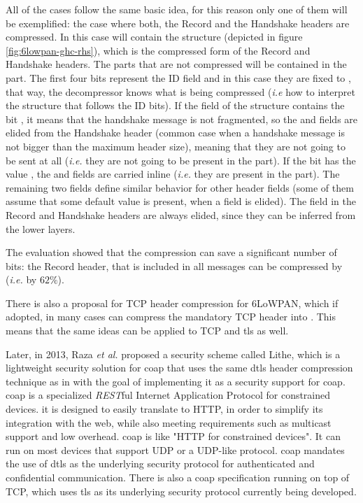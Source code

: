 \documentclass{llncs}
\begin{document}
All of the cases follow the same basic idea, for this reason only one of them will be exemplified:
the case where both, the Record and the Handshake headers are compressed.
In this case  will contain the 
structure (depicted in figure \ref{fig:6lowpan-ghc-rhs}), which is the compressed form of the Record and Handshake headers. The
parts that are not compressed will be contained in the  part.
The first four bits represent the ID field and in this case they are fixed to ,
that way, the decompressor knows what is being compressed (\textit{i.e} how to interpret
the structure that follows the ID bits). If the  field of the  structure contains the
bit , it means that the handshake message is not fragmented, so
the  and  fields are
elided from the Handshake header (common case when a handshake message is not bigger than
the maximum header size), meaning that they are not going to be sent at
all (\textit{i.e.} they are not going to be present in the  part).
If the  bit has the value , the 
and  fields are carried inline (\textit{i.e.} they are
present in the  part). The remaining two fields define similar
behavior for other header fields (some of them assume that some default value is present, when a field is elided).
The  field in the Record and Handshake headers are always elided,
since they can be inferred from the lower layers.

The evaluation showed that the compression can save a significant number of bits:
the Record header, that is included in all messages can be compressed by 
(\textit{i.e.} by $62\%$).

There is also a proposal for TCP header compression for 6LoWPAN\cite{I-D.aayadi-6lowpan-tcphc},
which if adopted, in many cases can compress the mandatory  TCP header
into . This means that the same ideas can be applied to TCP and
\gls{tls} as well.

Later, in 2013, Raza \textit{et al.} proposed a security scheme called Lithe\cite{LitheLig40:online},
which is a lightweight security solution for \gls{coap} that uses the same \gls{dtls} header
compression technique as in \cite{6LoWPANC53:online} with the goal of implementing
it as a security support for \gls{coap}. \gls{coap}\cite{RFC7959} is a specialized
\textit{REST}ful Internet Application Protocol for constrained devices. it is designed to easily
translate to HTTP, in order to simplify its integration with the web,
while also meeting requirements such as multicast support and low overhead.
\gls{coap} is like "HTTP for constrained devices".
It can run on most devices that support UDP or a UDP-like protocol.
\gls{coap} mandates the use of \gls{dtls} as the underlying security protocol for
authenticated and confidential communication. There is also a \gls{coap} specification
running on top of TCP, which uses \gls{tls} as its underlying security protocol
currently being developed\cite{I-D.ietf-core-coap-tcp-tls}.
\end{document}
